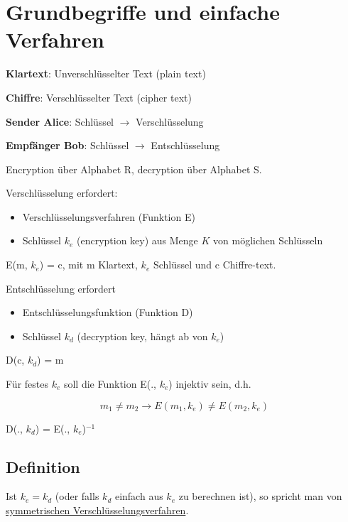 \section{Grundbegriffe und einfache Verfahren}

\textbf{Klartext}: Unverschlüsselter Text (plain text)

\textbf{Chiffre}: Verschlüsselter Text (cipher text)

\textbf{Sender Alice}: Schlüssel $\rightarrow$ Verschlüsselung

\textbf{Empfänger Bob}: Schlüssel $\rightarrow$ Entschlüsselung

\par \medskip

Encryption über Alphabet R, decryption über Alphabet S.

Verschlüsselung erfordert:

\begin{itemize}
  \item Verschlüsselungsverfahren (Funktion E)
  \item Schlüssel $k_e$ (encryption key) aus Menge $K$ von möglichen Schlüsseln
\end{itemize}

E(m, $k_e$) = c, mit m Klartext, $k_e$ Schlüssel und c Chiffre-text.

Entschlüsselung erfordert

\begin{itemize}
  \item Entschlüsselungsfunktion (Funktion D)
  \item Schlüssel $k_d$ (decryption key, hängt ab von $k_e$)
\end{itemize}

D(c, $k_d$) = m

Für festes $k_e$ soll die Funktion E(., $k_e$) injektiv sein, d.h. 

\begin{equation}
m_1 \neq m_2 \rightarrow E(m_1,k_e) \neq E(m_2, k_e)
\end{equation}

D(., $k_d$) = E(., $k_e$)$^{-1}$

\subsection{Definition}
Ist $k_e = k_d$ (oder falls $k_d$ einfach aus $k_e$ zu berechnen ist), so spricht man von \underline{symmetrischen Verschlüsselungsverfahren}.

\par \medskip

